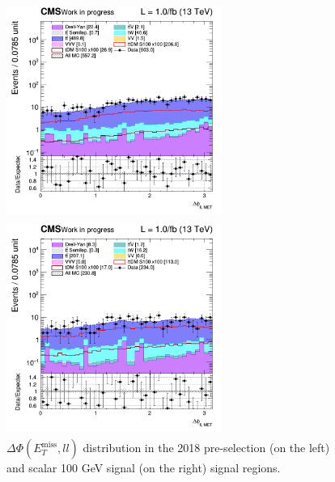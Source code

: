\documentclass[a4paper, 10pt, openright]{report}
\begin{document}
\begin{itemize}
\begin{figure}[htbp]
\centering
\begin{minipage}[b]{.48\textwidth}
\includegraphics[width=7cm, height=7cm]{figs/2018/SRBlinded-ttDM-scalar100/log_cratio_topCR_ll_dphillmet.png}
\end{minipage}\hfill
\begin{minipage}[b]{.48\textwidth}
\includegraphics[width=7cm, height=7cm]{figs/2018/SRBlinded-ttDM-scalar100/log_cratio_topCR_ll_BDT_ttDM100_dphillmet.png}
\end{minipage} \hfill
\caption{$\Delta \Phi(E_{T}^{\text{miss}}, ll)$ distribution in the 2018 pre-selection (on the left) and scalar 100 GeV signal (on the right) signal regions.}
\label{fig:SRdisc4}
\end{figure}



\end{itemize}
\end{document}
